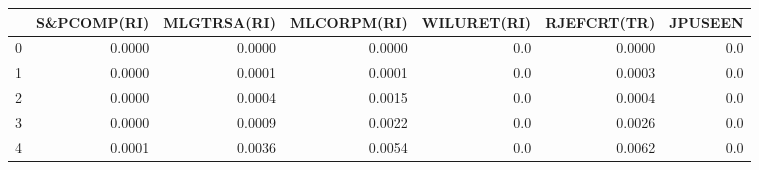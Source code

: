 \begin{tabular}{lrrrrrr}
\toprule
{} &  S\&PCOMP(RI) &  MLGTRSA(RI) &  MLCORPM(RI) &  WILURET(RI) &  RJEFCRT(TR) &  JPUSEEN \\
\midrule
0 &       0.0000 &       0.0000 &       0.0000 &          0.0 &       0.0000 &      0.0 \\
1 &       0.0000 &       0.0001 &       0.0001 &          0.0 &       0.0003 &      0.0 \\
2 &       0.0000 &       0.0004 &       0.0015 &          0.0 &       0.0004 &      0.0 \\
3 &       0.0000 &       0.0009 &       0.0022 &          0.0 &       0.0026 &      0.0 \\
4 &       0.0001 &       0.0036 &       0.0054 &          0.0 &       0.0062 &      0.0 \\
\bottomrule
\end{tabular}
